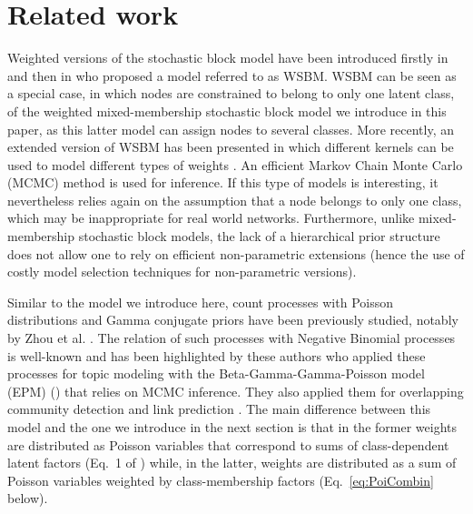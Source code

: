 \section{Related work}
\label{sec:rl}





Weighted versions of the stochastic block model have been introduced firstly in \cite{mariadassou2010} and then in \cite{aicher2014learning} who proposed a model referred to as WSBM. WSBM can be seen as a special case, in which nodes are constrained to belong to only one latent class, of the weighted mixed-membership stochastic block model we introduce in this paper, as this latter model can assign nodes to several classes. More recently, an extended version of WSBM has been presented in which different kernels can be used to model different types of weights \cite{peixoto2018nonparametric}. An efficient Markov Chain Monte Carlo (MCMC) method is used for inference. If this type of models is interesting, it nevertheless relies again on the assumption that a node belongs to only one class, which may be inappropriate for real world networks. Furthermore, unlike mixed-membership stochastic block models, the lack of a hierarchical prior structure does not allow one to rely on efficient non-parametric extensions (hence the use of costly model selection techniques for non-parametric versions). 

Similar to the model we introduce here, count processes with Poisson distributions and Gamma conjugate priors have been previously studied, notably by Zhou et al. \cite{zhou2012augment, zhou2015negative}. The relation of such processes with Negative Binomial processes is well-known and has been highlighted by these authors who applied  these processes for topic modeling with the Beta-Gamma-Gamma-Poisson model (EPM) (\cite{zhou2012beta}) that relies on MCMC inference. They also applied them for overlapping community detection and link prediction \cite{zhou2015}. The main difference between this model and the one we introduce in the next section is that in the former weights are distributed as Poisson variables that correspond to sums of class-dependent latent factors (Eq.~1 of \cite{zhou2012beta}) while, in the latter, weights are distributed as a sum of Poisson variables weighted by class-membership factors (Eq.~\ref{eq:PoiCombin} below).

